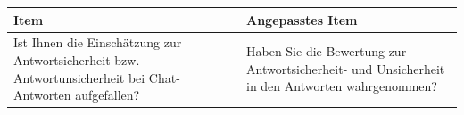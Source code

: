 \begin{center}
\begin{threeparttable}
\caption{Items für Konstrukt: Treatment\_Check}
\label{tab:Treatment_Check}
\begin{tabularx}{\textwidth}{X X}
\toprule
\textbf{Item} & \textbf{Angepasstes Item} \\
\midrule
Ist Ihnen die Einschätzung zur Antwortsicherheit bzw. Antwortunsicherheit bei Chat-Antworten aufgefallen? & Haben Sie die Bewertung zur Antwortsicherheit- und Unsicherheit in den Antworten wahrgenommen? \\
\bottomrule
\end{tabularx}
\end{threeparttable}
\end{center}
\vspace{1em}